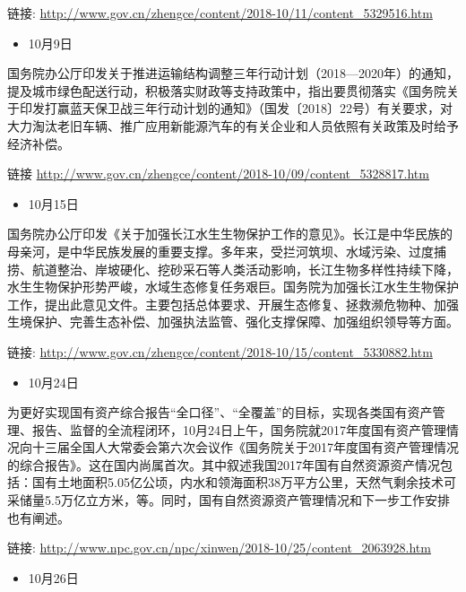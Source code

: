 \documentclass[
]{book}
\providecommand{\tightlist}{%
  \setlength{\itemsep}{0pt}\setlength{\parskip}{0pt}}
\begin{document}
链接: \url{http://www.gov.cn/zhengce/content/2018-10/11/content_5329516.htm}

\begin{itemize}
\tightlist
\item
  10月9日
\end{itemize}

国务院办公厅印发关于推进运输结构调整三年行动计划（2018---2020年）的通知，提及城市绿色配送行动，积极落实财政等支持政策中，指出要贯彻落实《国务院关于印发打赢蓝天保卫战三年行动计划的通知》（国发〔2018〕22号）有关要求，对大力淘汰老旧车辆、推广应用新能源汽车的有关企业和人员依照有关政策及时给予经济补偿。

链接 \url{http://www.gov.cn/zhengce/content/2018-10/09/content_5328817.htm}

\begin{itemize}
\tightlist
\item
  10月15日
\end{itemize}

国务院办公厅印发《关于加强长江水生生物保护工作的意见》。长江是中华民族的母亲河，是中华民族发展的重要支撑。多年来，受拦河筑坝、水域污染、过度捕捞、航道整治、岸坡硬化、挖砂采石等人类活动影响，长江生物多样性持续下降，水生生物保护形势严峻，水域生态修复任务艰巨。国务院为加强长江水生生物保护工作，提出此意见文件。主要包括总体要求、开展生态修复、拯救濒危物种、加强生境保护、完善生态补偿、加强执法监管、强化支撑保障、加强组织领导等方面。

链接: \url{http://www.gov.cn/zhengce/content/2018-10/15/content_5330882.htm}

\begin{itemize}
\tightlist
\item
  10月24日
\end{itemize}

为更好实现国有资产综合报告``全口径''、``全覆盖''的目标，实现各类国有资产管理、报告、监督的全流程闭环，10月24日上午，国务院就2017年度国有资产管理情况向十三届全国人大常委会第六次会议作《国务院关于2017年度国有资产管理情况的综合报告》。这在国内尚属首次。其中叙述我国2017年国有自然资源资产情况包括：国有土地面积5.05亿公顷，内水和领海面积38万平方公里，天然气剩余技术可采储量5.5万亿立方米，等。同时，国有自然资源资产管理情况和下一步工作安排也有阐述。

链接: \url{http://www.npc.gov.cn/npc/xinwen/2018-10/25/content_2063928.htm}

\begin{itemize}
\tightlist
\item
  10月26日
\end{itemize}
\end{document}
